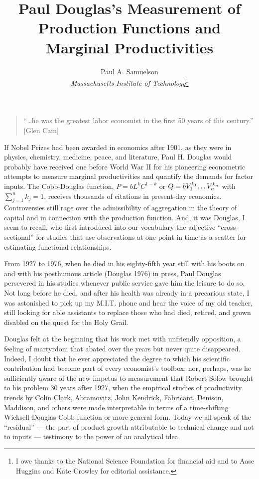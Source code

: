 \documentclass{article}
\title{Paul Douglas's Measurement of Production Functions and Marginal Productivities}
\author{
	Paul A. Samuelson\\
	\emph{Massachusetts Institute of Technology}\thanks{I owe thanks to the National Science Foundation for financial aid and to Aase Huggins and Kate Crowley for editorial assistance.}
}
\begin{document}
\maketitle

\begin{quote}
``\dots he was the greatest labor economist in the first 50 years of this century.'' [Glen Cain]
\end{quote}

\noindent If Nobel Prizes had been awarded in economics after 1901, as they were in physics, chemistry, medicine, peace, and literature, Paul H. Douglas would probably have received one before World War II for his pioneering econometric attempts to measure marginal productivities and quantify the demands for factor inputs. The Cobb-Douglas function, \(P=bL^kC^{1-k}\) or \(Q=bV_1^{k_1}\text{\dots}V_n^{k_n}\) with \(\sum_{j=1}^n k_j = 1\), receives thousands of citations in present-day economics. Controversies still rage over the admissibility of aggregation in the theory of capital and in connection with the production function. And, it was Douglas, I seem to recall, who first introduced into our vocabulary the adjective ``cross-sectional'' for studies that use observations at one point in time as a scatter for estimating functional relationships.

From 1927 to 1976, when he died in his eighty-fifth year still with his boots on and with his posthumous article (Douglas 1976) in press, Paul Douglas persevered in his studies whenever public service gave him the leisure to do so. Not long before he died, and after his health was already in a precarious state, I was astonished to pick up my M.I.T. phone and hear the voice of my old teacher, still looking for able assistants to replace those who had died, retired, and grown disabled on the quest for the Holy Grail.




Douglas felt at the beginning that his work met with unfriendly opposition, a feeling of martyrdom that abated over the years but never quite disappeared. Indeed, I doubt that he ever appreciated the degree to which his scientific contribution had become part of every economist's toolbox; nor, perhaps, was he sufficiently aware of the new impetus to measurement that Robert Solow brought to his problem 30 years after 1927, when the empirical studies of productivity trends by Colin Clark, Abramovitz, John Kendrick, Fabricant, Denison, Maddison, and others were made interpretable in terms of a time-shifting Wicksell-Douglas-Cobb function or more general form. Today we all speak of the ``residual'' --- the part of product growth attributable to technical change and not to inputs --- testimony to the power of an analytical idea.
\end{document}
